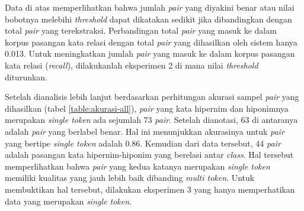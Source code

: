Data di atas memperlihatkan bahwa jumlah \textit{pair} yang diyakini benar atau nilai bobotnya melebihi \textit{threshold} dapat dikatakan sedikit jika dibandingkan dengan total \textit{pair} yang terekstraksi. Perbandingan total \textit{pair} yang masuk ke dalam korpus pasangan kata relasi dengan total \textit{pair} yang dihasilkan oleh sistem hanya 0.013. Untuk meningkatkan jumlah \textit{pair} yang masuk ke dalam korpus pasangan kata relasi (\textit{recall}), dilakukanlah eksperimen 2 di mana nilai \textit{threshold} diturunkan.

Setelah dianalisis lebih lanjut berdasarkan perhitungan akurasi sampel \textit{pair} yang dihasilkan (tabel \ref{table:akurasi-all}), \textit{pair} yang kata hipernim dan hiponimnya merupakan \textit{single token} ada sejumlah 73 \textit{pair}. Setelah dianotasi, 63 di antaranya adalah \textit{pair} yang berlabel benar. Hal ini menunjukkan akurasinya untuk \textit{pair} yang bertipe \textit{single token} adalah 0.86. Kemudian dari data tersebut, 44 \textit{pair} adalah pasangan kata hipernim-hiponim yang berelasi antar \textit{class}. Hal tersebut memperlihatkan bahwa \textit{pair} yang kedua katanya merupakan \textit{single token} memiliki kualitas yang jauh lebih baik dibanding \textit{multi token}. Untuk membuktikan hal tersebut, dilakukan eksperimen 3 yang hanya memperhatikan data yang merupakan \textit{single token}.
%

